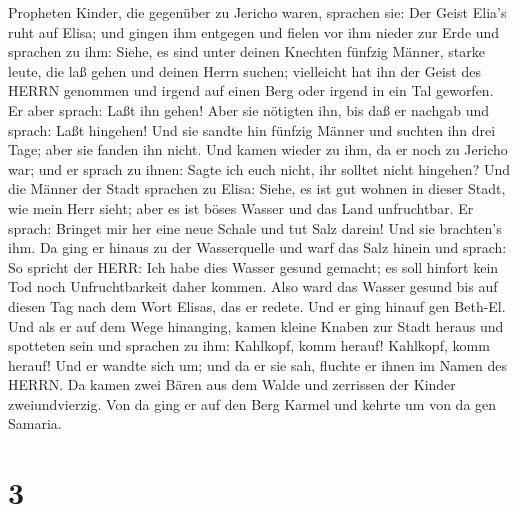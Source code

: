 Propheten Kinder, die gegenüber zu Jericho waren, sprachen sie: Der
Geist Elia's ruht auf Elisa; und gingen ihm entgegen und fielen vor ihm
nieder zur Erde  und sprachen zu ihm: Siehe, es sind unter
deinen Knechten fünfzig Männer, starke leute, die laß gehen und deinen
Herrn suchen; vielleicht hat ihn der Geist des HERRN genommen und irgend
auf einen Berg oder irgend in ein Tal geworfen. Er aber sprach: Laßt ihn
gehen!  Aber sie nötigten ihn, bis daß er nachgab und
sprach: Laßt hingehen! Und sie sandte hin fünfzig Männer und suchten ihn
drei Tage; aber sie fanden ihn nicht.  Und kamen wieder zu
ihm, da er noch zu Jericho war; und er sprach zu ihnen: Sagte ich euch
nicht, ihr solltet nicht hingehen?  Und die Männer der
Stadt sprachen zu Elisa: Siehe, es ist gut wohnen in dieser Stadt, wie
mein Herr sieht; aber es ist böses Wasser und das Land unfruchtbar.
 Er sprach: Bringet mir her eine neue Schale und tut Salz
darein! Und sie brachten's ihm.  Da ging er hinaus zu der
Wasserquelle und warf das Salz hinein und sprach: So spricht der HERR:
Ich habe dies Wasser gesund gemacht; es soll hinfort kein Tod noch
Unfruchtbarkeit daher kommen.  Also ward das Wasser gesund
bis auf diesen Tag nach dem Wort Elisas, das er redete. 
Und er ging hinauf gen Beth-El. Und als er auf dem Wege hinanging, kamen
kleine Knaben zur Stadt heraus und spotteten sein und sprachen zu ihm:
Kahlkopf, komm herauf! Kahlkopf, komm herauf!  Und er
wandte sich um; und da er sie sah, fluchte er ihnen im Namen des HERRN.
Da kamen zwei Bären aus dem Walde und zerrissen der Kinder
zweiundvierzig.  Von da ging er auf den Berg Karmel und
kehrte um von da gen Samaria.

\hypertarget{section-2}{%
\section{3}\label{section-2}}

